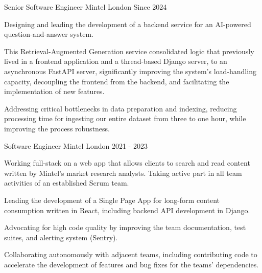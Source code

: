 \documentclass[11pt, a4paper]{awesome-cv}
\begin{document}
\begin{cventries}

  \cventry
    {Senior Software Engineer} %
    {Mintel} %
    {London} %
    {Since 2024} %
    {
      \begin{cvitems} %
        \item {Designing and leading the development of a backend service for an AI-powered question-and-answer system.}
        \item {This Retrieval-Augmented Generation service consolidated logic that previously lived in a frontend application and a thread-based Django server, to an asynchronous FastAPI server, significantly improving the system's load-handling capacity, decoupling the frontend from the backend, and facilitating the implementation of new features.}
        \item {Addressing critical bottlenecks in data preparation and indexing, reducing processing time for ingesting our entire dataset from three to one hour, while improving the process robustness.}
      \end{cvitems}
    }

  \cventry
    {Software Engineer} %
    {Mintel} %
    {London} %
    {2021 - 2023} %
    {
      \begin{cvitems} %
        \item {Working full-stack on a web app that allows clients to search and read content written by Mintel's market research analysts. Taking active part in all team activities of an established Scrum team.}
        \item {Leading the development of a Single Page App for long-form content consumption written in React, including backend API development in Django.}
        \item {Advocating for high code quality by improving the team documentation, test suites, and alerting system (Sentry).}
        \item {Collaborating autonomously with adjacent teams, including contributing code to accelerate the development of features and bug fixes for the teams' dependencies.}
      \end{cvitems}
    }


\end{cventries}
\end{document}
